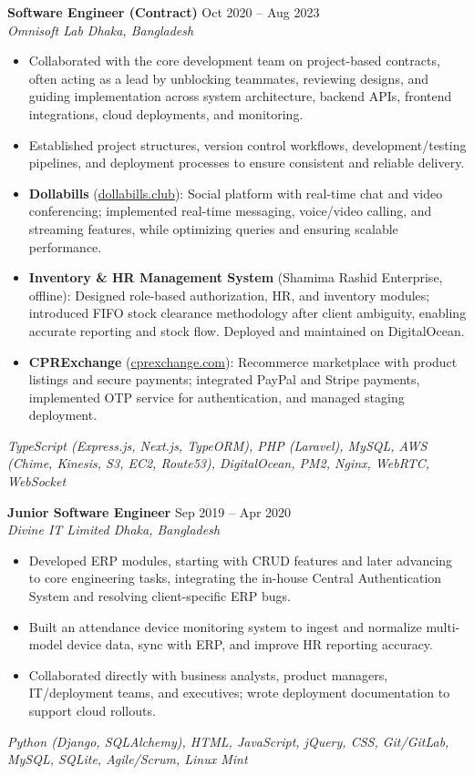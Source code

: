 \documentclass[a4paper,10pt]{article}
\begin{document}
\textbf{Software Engineer (Contract)} \hfill Oct 2020 -- Aug 2023\\[-2pt]
\textit{Omnisoft Lab \textbar{} Dhaka, Bangladesh}\\[-4pt]
\begin{itemize}
  \item Collaborated with the core development team on project-based contracts, often acting as a lead by unblocking teammates, reviewing designs, and guiding implementation across system architecture, backend APIs, frontend integrations, cloud deployments, and monitoring.
  \item Established project structures, version control workflows, development/testing pipelines, and deployment processes to ensure consistent and reliable delivery.
  \item \textbf{Dollabills} (\href{https://dollabills.club}{dollabills.club}): Social platform with real-time chat and video conferencing; implemented real-time messaging, voice/video calling, and streaming features, while optimizing queries and ensuring scalable performance.
  \item \textbf{Inventory \& HR Management System} (Shamima Rashid Enterprise, offline): Designed role-based authorization, HR, and inventory modules; introduced FIFO stock clearance methodology after client ambiguity, enabling accurate reporting and stock flow. Deployed and maintained on DigitalOcean.
  \item \textbf{CPRExchange} (\href{https://cprexchange.com}{cprexchange.com}): Recommerce marketplace with product listings and secure payments; integrated PayPal and Stripe payments, implemented OTP service for authentication, and managed staging deployment.
\end{itemize}
\emph{TypeScript (Express.js, Next.js, TypeORM), PHP (Laravel), MySQL, AWS (Chime, Kinesis, S3, EC2, Route53), DigitalOcean, PM2, Nginx, WebRTC, WebSocket}

\vspace{1pt}

\textbf{Junior Software Engineer} \hfill Sep 2019 -- Apr 2020\\[-2pt]
\textit{Divine IT Limited \textbar{} Dhaka, Bangladesh}\\[-4pt]
\begin{itemize}
  \item Developed ERP modules, starting with CRUD features and later advancing to core engineering tasks, integrating the in-house Central Authentication System and resolving client-specific ERP bugs.
  \item Built an attendance device monitoring system to ingest and normalize multi-model device data, sync with ERP, and improve HR reporting accuracy.
  \item Collaborated directly with business analysts, product managers, IT/deployment teams, and executives; wrote deployment documentation to support cloud rollouts.
\end{itemize}
\emph{Python (Django, SQLAlchemy), HTML, JavaScript, jQuery, CSS, Git/GitLab, MySQL, SQLite, Agile/Scrum, Linux Mint}
\end{document}
